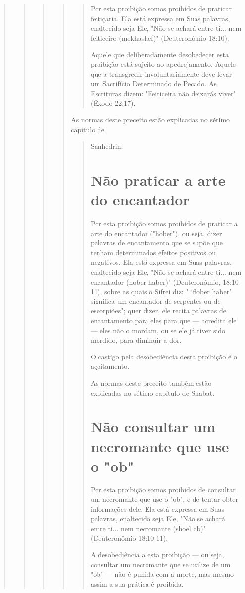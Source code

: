 \begin{quote}
\begin{quote}
\begin{quote}
\begin{quote}
\begin{quote}
Por esta proibição somos proibidos de praticar feitiçaria. Ela está
ex­pressa em Suas palavras, enaltecido seja Ele, "Não se achará entre
ti... nem feiti­ceiro (mekhashef)" (Deuteronômio 18:10).

Aquele que deliberadamente desobedecer esta proibição está sujei­to ao
apedrejamento. Aquele que a transgredir involuntariamente deve levar um
Sacrifício Determinado de Pecado. As Escrituras dizem: "Feiticeira não
dei­xarás viver" (Êxodo 22:17).
\end{quote}

As normas deste preceito estão explicadas no sétimo capítulo de

\begin{quote}
Sanhedrin.

\section{Não praticar a arte do encantador}

Por esta proibição somos proibidos de praticar a arte do encantador
("hober"), ou seja, dizer palavras de encantamento que se supõe que
tenham determinados efeitos positivos ou negativos. Ela está expressa em
Suas pala­vras, enaltecido seja Ele, "Não se achará entre ti... nem
encantador (hober ha­ber)" (Deuteronômio, 18:10-11), sobre as quais o
Sifrei diz: " `flober haber' significa um encantador de serpentes ou de
escorpiões"; quer dizer, ele recita palavras de encantamento para eles
para que --- acredita ele --- eles não o mor­dam, ou se ele já tiver
sido mordido, para diminuir a dor.

O castigo pela desobediência desta proibição é o açoitamento.

As normas deste preceito também estão explicadas no sétimo capí­tulo de
Shabat.

\section{Não consultar um necromante que use o "ob"}

Por esta proibição somos proibidos de consultar um necromante que use o
"ob", e de tentar obter informações dele. Ela está expressa em Suas
pala­vras, enaltecido seja Ele, "Não se achará entre ti... nem
necromante (shoel ob)" (Deuteronômio 18:10-11).

A desobediência a esta proibição --- ou seja, consultar um necromante
que se utilize de um "ob" --- não é punida com a morte, mas mesmo assim
a sua prática é proibida.
\end{quote}


\end{quote}
\end{quote}
\end{quote}
\end{quote}
